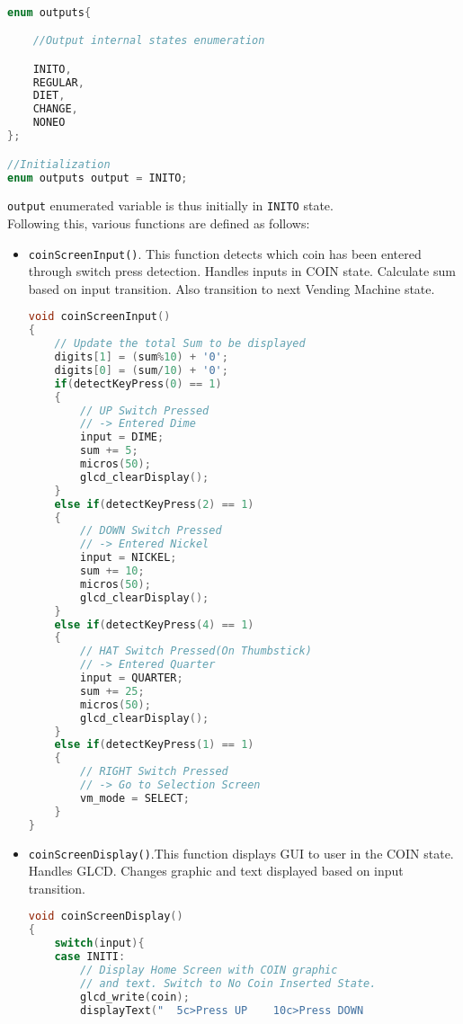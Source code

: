 \documentclass{article}
\begin{document}
    \begin{lstlisting}[basicstyle = \small, language = C]

enum outputs{

    //Output internal states enumeration

    INITO,
    REGULAR,
    DIET,
    CHANGE,
    NONEO
};

//Initialization
enum outputs output = INITO;
  \end{lstlisting}
    \texttt{output} enumerated variable is thus initially in \texttt{INITO} state. \\
\qquad Following this, various functions are defined as follows:
\begin{itemize}
  \item \texttt{coinScreenInput()}. This function detects which coin has been entered through switch press detection. Handles inputs in COIN state. Calculate sum based on input transition. Also transition to next Vending Machine state.
      \begin{lstlisting}[basicstyle = \small, language = C]
void coinScreenInput()
{
    // Update the total Sum to be displayed
    digits[1] = (sum%10) + '0';
    digits[0] = (sum/10) + '0';
    if(detectKeyPress(0) == 1)
    {
        // UP Switch Pressed 
        // -> Entered Dime
        input = DIME;
        sum += 5;
        micros(50);
        glcd_clearDisplay();
    }
    else if(detectKeyPress(2) == 1)
    {
        // DOWN Switch Pressed 
        // -> Entered Nickel
        input = NICKEL;
        sum += 10;
        micros(50);
        glcd_clearDisplay();
    }
    else if(detectKeyPress(4) == 1)
    {
        // HAT Switch Pressed(On Thumbstick) 
        // -> Entered Quarter
        input = QUARTER;
        sum += 25;
        micros(50);
        glcd_clearDisplay();
    }
    else if(detectKeyPress(1) == 1)
    {
        // RIGHT Switch Pressed 
        // -> Go to Selection Screen
        vm_mode = SELECT;
    }
}
  \end{lstlisting}
  \item \texttt{coinScreenDisplay()}.This function displays GUI to user in the COIN state. Handles GLCD. Changes graphic and text displayed based on input transition.
      \begin{lstlisting}[basicstyle = \small, language = C]
void coinScreenDisplay()
{
    switch(input){
    case INITI:
        // Display Home Screen with COIN graphic 
        // and text. Switch to No Coin Inserted State.
        glcd_write(coin);
        displayText("  5c>Press UP    10c>Press DOWN

\end{lstlisting}
\end{itemize}
\end{document}
